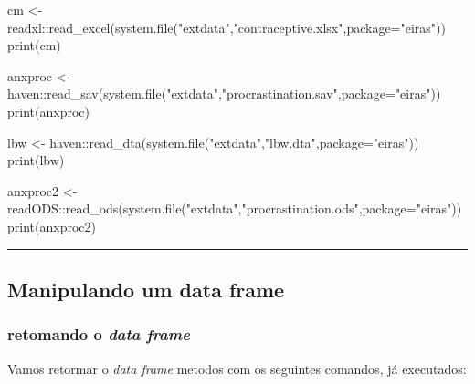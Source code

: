 \documentclass[
]{article}
\newenvironment{Shaded}{\begin{snugshade}}{\end{snugshade}}
\newcommand{\AttributeTok}[1]{\textcolor[rgb]{0.77,0.63,0.00}{#1}}
\newcommand{\FunctionTok}[1]{\textcolor[rgb]{0.00,0.00,0.00}{#1}}
\newcommand{\NormalTok}[1]{#1}
\newcommand{\OtherTok}[1]{\textcolor[rgb]{0.56,0.35,0.01}{#1}}
\newcommand{\SpecialCharTok}[1]{\textcolor[rgb]{0.00,0.00,0.00}{#1}}
\newcommand{\StringTok}[1]{\textcolor[rgb]{0.31,0.60,0.02}{#1}}
\begin{document}
\begin{Shaded}
\begin{Highlighting}[]
\NormalTok{cm }\OtherTok{\textless{}{-}}\NormalTok{ readxl}\SpecialCharTok{::}\FunctionTok{read\_excel}\NormalTok{(}\FunctionTok{system.file}\NormalTok{(}\StringTok{"extdata"}\NormalTok{,}\StringTok{"contraceptive.xlsx"}\NormalTok{,}\AttributeTok{package=}\StringTok{"eiras"}\NormalTok{))}
\FunctionTok{print}\NormalTok{(cm)}

\NormalTok{anxproc }\OtherTok{\textless{}{-}}\NormalTok{ haven}\SpecialCharTok{::}\FunctionTok{read\_sav}\NormalTok{(}\FunctionTok{system.file}\NormalTok{(}\StringTok{"extdata"}\NormalTok{,}\StringTok{"procrastination.sav"}\NormalTok{,}\AttributeTok{package=}\StringTok{"eiras"}\NormalTok{))}
\FunctionTok{print}\NormalTok{(anxproc)}

\NormalTok{lbw }\OtherTok{\textless{}{-}}\NormalTok{ haven}\SpecialCharTok{::}\FunctionTok{read\_dta}\NormalTok{(}\FunctionTok{system.file}\NormalTok{(}\StringTok{"extdata"}\NormalTok{,}\StringTok{"lbw.dta"}\NormalTok{,}\AttributeTok{package=}\StringTok{"eiras"}\NormalTok{))}
\FunctionTok{print}\NormalTok{(lbw)}

\NormalTok{anxproc2 }\OtherTok{\textless{}{-}}\NormalTok{ readODS}\SpecialCharTok{::}\FunctionTok{read\_ods}\NormalTok{(}\FunctionTok{system.file}\NormalTok{(}\StringTok{"extdata"}\NormalTok{,}\StringTok{"procrastination.ods"}\NormalTok{,}\AttributeTok{package=}\StringTok{"eiras"}\NormalTok{))}
\FunctionTok{print}\NormalTok{(anxproc2)}
\end{Highlighting}
\end{Shaded}

\begin{center}\rule{0.5\linewidth}{0.5pt}\end{center}

\hypertarget{manipulando-um-data-frame}{%
\subsection{Manipulando um data frame}\label{manipulando-um-data-frame}}

\hypertarget{retomando-o-data-frame}{%
\subsubsection{\texorpdfstring{retomando o \emph{data
frame}}{retomando o data frame}}\label{retomando-o-data-frame}}

Vamos retormar o \emph{data frame} metodos com os seguintes comandos, já
executados:
\end{document}
